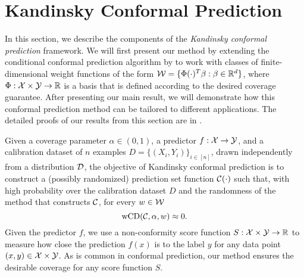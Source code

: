 \section{Kandinsky Conformal Prediction}
\begin{comment}
Content:
\begin{enumerate}
    \item Algorithms for shift captured by $g(x,y)$,  an extension of the algorithm by UPenn 
    \item Results when $g(x,y)$ has finite dimension
    \item Applications of this type of distribution shift:
    \begin{itemize}
        \item group conditional guarantees
        \item concept shift
        \item class conditional guarantees
        \item combine the above
        \item groups defined on both x and y
    \end{itemize}
\end{enumerate}
\end{comment}

\label{sec:algorithm}
In this section, we describe the components of the \emph{Kandinsky conformal prediction} framework. We will first present our method by extending the conditional conformal prediction algorithm by \citet{JNRR2023} to work with classes of finite-dimensional weight functions of the form ${\cal W} = \{\Phi(\cdot)^T \beta : \beta \in \mathbb{R}^d\}$, where $\Phi:{\cal X} \times {\cal Y} \to \mathbb{R}$ is a basis that is defined according to the desired coverage guarantee. After presenting our main result, we will demonstrate how this conformal prediction method can be tailored to different applications. The detailed proofs of our results from this section are in .

 Given a coverage parameter $\alpha \in (0,1)$, a predictor $f:{\cal X} \to {\cal Y}$, and a calibration dataset of $n$ examples $D = \{(X_i,Y_i)\}_{i\in [n]}$, drawn independently from a distribution ${\cal D}$, the objective of {Kandinsky conformal prediction} is to construct a (possibly randomized) prediction set function ${\cal C}(\cdot)$ such that, with high probability over the calibration dataset $D$ and the randomness of the method that constructs ${\cal C}$, for every $w \in \cal W$
\begin{equation*}
\operatorname{wCD}({\cal C}, \alpha, w) \approx 0.
\end{equation*}
Given the predictor $f$, we use a non-conformity score function $S:{\cal X} \times {\cal Y} \to \mathbb{R}$ to measure how close the prediction $f(x)$ is to the label $y$ for any data point $(x,y) \in {\cal X} \times {\cal Y}$. As is common in conformal prediction, our method ensures the desirable coverage for any score function $S$.

